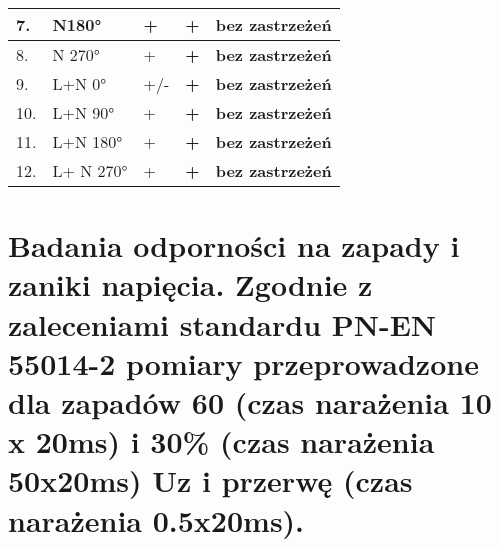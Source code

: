 \documentclass{classrep}
\begin{document}
\begin{table}[H]
\begin{tabular}{|l|l|l|l|l|}
		7.                           & N180°                             & +                                   & \textbf{+}                        & \textbf{bez zastrzeżeń}                                       \\ \hline
		8.                           & N 270°                            & +                                   & \textbf{+}                        & \textbf{bez zastrzeżeń}                                       \\ \hline
		9.                           & L+N 0°                            & +/-                                 & \textbf{+}                        & \textbf{bez zastrzeżeń}                                       \\ \hline
		10.                          & L+N 90°                           & +                                   & \textbf{+}                        & \textbf{bez zastrzeżeń}                                       \\ \hline
		11.                          & L+N 180°                          & +                                   & \textbf{+}                        & \textbf{bez zastrzeżeń}                                       \\ \hline
		12.                          & L+ N 270°                         & +                                   & \textbf{+}                        & \textbf{bez zastrzeżeń}                                       \\ \hline
	\end{tabular}
\end{table}

\section{Badania odporności na zapady i zaniki  napięcia. Zgodnie z zaleceniami standardu PN-EN 55014-2 pomiary przeprowadzone dla zapadów 60 (czas narażenia 10 x 20ms) i  30\% (czas narażenia 50x20ms) Uz i przerwę (czas narażenia 0.5x20ms).}
\end{document}
